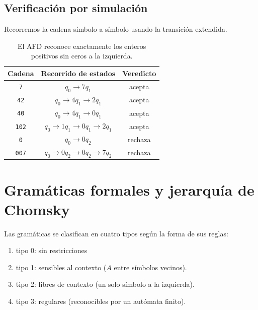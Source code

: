 \documentclass[10pt,a4paper]{article}
\theoremstyle{definition}
\begin{document}
\subsection{Verificación por simulación}

Recorremos la cadena símbolo a símbolo usando la transición extendida.

\begin{table}[h]

    \centering
    
    \begin{tabular}{c|c|c}
        \toprule
        Cadena & Recorrido de estados & Veredicto \\
        \midrule
        \texttt{7} & $q_0 \rightarrow {7} q_1$ & acepta \\
        \texttt{42} & $q_0 \rightarrow {4} q_1 \rightarrow {2} q_1$ & acepta \\
        \texttt{40} & $q_0 \rightarrow {4} q_1 \rightarrow {0} q_1$ & acepta \\
        \texttt{102} & $q_0 \rightarrow {1} q_1 \rightarrow {0} q_1 \rightarrow{2} q_1$ & acepta\\
        \texttt{0} & $q_0 \rightarrow{0} q_2$ & rechaza \\
        \texttt{007} & $q_0 \rightarrow {0} q_2 \rightarrow {0} q_2 \rightarrow {7} q_2$ & rechaza \\
        \bottomrule
    \end{tabular}

    \caption{El AFD reconoce exactamente los enteros positivos sin ceros a la izquierda.}

\end{table}

\section{Gramáticas formales y jerarquía de Chomsky}

Las gramáticas se clasifican en cuatro tipos según la forma de sus reglas:

\begin{enumerate}
    \item tipo 0: sin restricciones
    \item tipo 1: sensibles al contexto ($A$ entre símbolos vecinos).
    \item tipo 2: libres de contexto (un solo símbolo a la izquierda).
    \item tipo 3: regulares (reconocibles por un autómata finito).
\end{enumerate}
\end{document}
